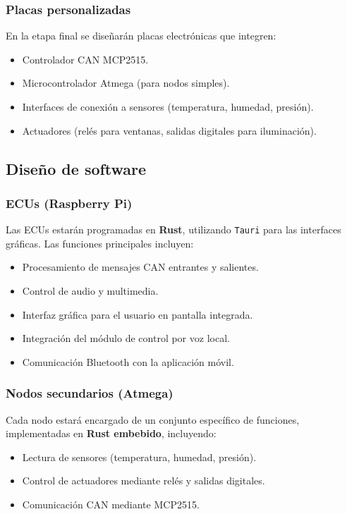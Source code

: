 \subsubsection{Placas personalizadas}
En la etapa final se diseñarán placas electrónicas que integren:
\begin{itemize}
    \item Controlador CAN MCP2515.
    \item Microcontrolador Atmega (para nodos simples).
    \item Interfaces de conexión a sensores (temperatura, humedad, presión).
    \item Actuadores (relés para ventanas, salidas digitales para iluminación).
\end{itemize}

\subsection{Diseño de software}

\subsubsection{ECUs (Raspberry Pi)}
Las ECUs estarán programadas en \textbf{Rust}, utilizando \texttt{Tauri} para las interfaces gráficas. Las funciones principales incluyen:
\begin{itemize}
    \item Procesamiento de mensajes CAN entrantes y salientes.
    \item Control de audio y multimedia.
    \item Interfaz gráfica para el usuario en pantalla integrada.
    \item Integración del módulo de control por voz local.
    \item Comunicación Bluetooth con la aplicación móvil.
\end{itemize}

\subsubsection{Nodos secundarios (Atmega)}
Cada nodo estará encargado de un conjunto específico de funciones, implementadas en \textbf{Rust embebido}, incluyendo:
\begin{itemize}
    \item Lectura de sensores (temperatura, humedad, presión).
    \item Control de actuadores mediante relés y salidas digitales.
    \item Comunicación CAN mediante MCP2515.
\end{itemize}

